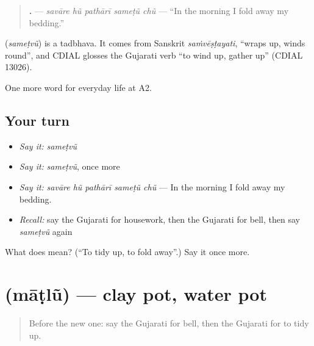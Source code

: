 \begin{quote}
\textbf{    .} — \emph{savāre hũ pathārī sameṭũ chũ} — \textquotedblleft{}In the morning I fold away my bedding.\textquotedblright{}
\end{quote}

\begin{cousinweb}
\textbf{} (\emph{sameṭvũ}) is a tadbhava. It comes from Sanskrit \emph{saṁvēṣṭayati}, \textquotedblleft{}wraps up, winds round\textquotedblright{}, and CDIAL glosses the Gujarati verb \textquotedblleft{}to wind up, gather up\textquotedblright{} (CDIAL 13026).
\end{cousinweb}

\begin{grammarlens}[title={What you've built}]
One more word for everyday life at A2.
\end{grammarlens}

\subsection*{Your turn}
\begin{itemize}
\raggedright
  \item \emph{Say it:} \emph{sameṭvũ}
  \item \emph{Say it:} \emph{sameṭvũ}, once more
  \item \emph{Say it:} \emph{savāre hũ pathārī sameṭũ chũ} — In the morning I fold away my bedding.
  \item \emph{Recall:} say the Gujarati for housework, then the Gujarati for bell, then say \emph{sameṭvũ} again
\end{itemize}

\begin{tcolorbox}[breakable,colback=teal!4,colframe=teal!35!black,title={Before you move on}]
What does  mean? (\textquotedblleft{}To tidy up, to fold away\textquotedblright{}.) Say it once more.
\end{tcolorbox}
\section[\texorpdfstring{\gu{માટલું} (māṭlũ)}{માટલું (māṭlũ)}]{ (māṭlũ) — clay pot, water pot}

\label{lesson:GU-C162-matlu}



\begin{quote}
Before the new one: say the Gujarati for bell, then the Gujarati for to tidy up.
\end{quote}

